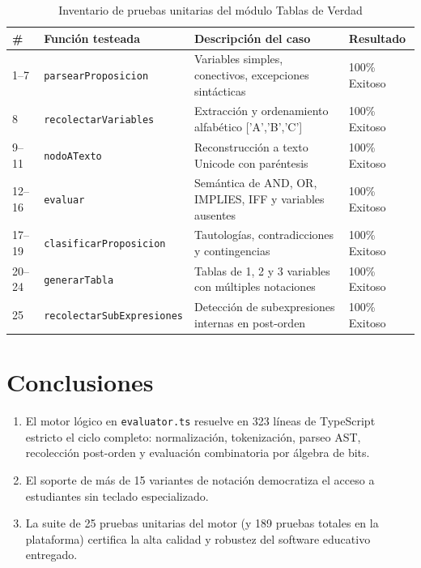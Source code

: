 \documentclass[11pt,a4paper]{article}
\begin{document}
\begin{table}[H]
\centering
\caption{Inventario de pruebas unitarias del módulo Tablas de Verdad}
\label{tab:inventario_tests}
\small
\begin{tabularx}{\textwidth}{llXl}
\toprule
\textbf{\#} & \textbf{Función testeada} & \textbf{Descripción del caso} & \textbf{Resultado} \\
\midrule
1--7 & \texttt{parsearProposicion} & Variables simples, conectivos, excepciones sintácticas & 100\% Exitoso \\
8 & \texttt{recolectarVariables} & Extracción y ordenamiento alfabético ['A','B','C'] & 100\% Exitoso \\
9--11 & \texttt{nodoATexto} & Reconstrucción a texto Unicode con paréntesis & 100\% Exitoso \\
12--16 & \texttt{evaluar} & Semántica de AND, OR, IMPLIES, IFF y variables ausentes & 100\% Exitoso \\
17--19 & \texttt{clasificarProposicion} & Tautologías, contradicciones y contingencias & 100\% Exitoso \\
20--24 & \texttt{generarTabla} & Tablas de 1, 2 y 3 variables con múltiples notaciones & 100\% Exitoso \\
25 & \texttt{recolectarSubExpresiones} & Detección de subexpresiones internas en post-orden & 100\% Exitoso \\
\bottomrule
\end{tabularx}
\end{table}

\section{Conclusiones}

\begin{enumerate}[label=\arabic*.]
  \item El motor lógico en \texttt{evaluator.ts} resuelve en 323 líneas de TypeScript estricto el ciclo completo: normalización, tokenización, parseo AST, recolección post-orden y evaluación combinatoria por álgebra de bits.
  \item El soporte de más de 15 variantes de notación democratiza el acceso a estudiantes sin teclado especializado.
  \item La suite de 25 pruebas unitarias del motor (y 189 pruebas totales en la plataforma) certifica la alta calidad y robustez del software educativo entregado.
\end{enumerate}
\end{document}
